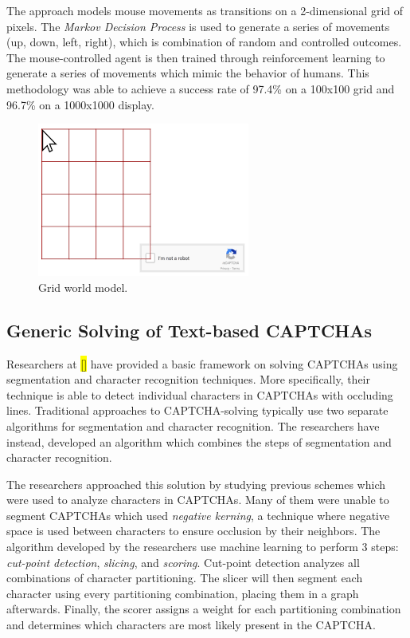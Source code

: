 \documentclass[11pt,conference]{IEEEtran}
\begin{document}
The approach models mouse movements as transitions on a 2-dimensional grid
of pixels. The \emph{Markov Decision Process} is used to generate a series of
movements (up, down, left, right), which is combination of random and controlled
outcomes. The mouse-controlled agent is then trained through reinforcement
learning to generate a series of movements which mimic the behavior of humans.
This methodology was able to achieve a success rate of 97.4\% on a 100x100
grid and 96.7\% on a 1000x1000 display.

\begin{figure}[htbp]
	\centerline{\includegraphics[scale=0.5]{images/grid-world.png}}
	\caption{Grid world model.}
	\label{figure}
\end{figure}

\subsection{Generic Solving of Text-based CAPTCHAs}
Researchers at \hl{[]} have provided a basic framework on solving CAPTCHAs using
segmentation and character recognition techniques. More specifically, their
technique is able to detect individual characters in CAPTCHAs with occluding
lines. Traditional approaches to CAPTCHA-solving typically use two separate
algorithms for segmentation and character recognition. The researchers have
instead, developed an algorithm which combines the steps of segmentation and character
recognition.

The researchers approached this solution by studying previous schemes which
were used to analyze characters in CAPTCHAs. Many of them were unable to
segment CAPTCHAs which used \emph{negative kerning}, a technique
where negative space is used between characters to ensure occlusion 
by their neighbors. The algorithm developed by the researchers use machine
learning to perform 3 steps: \emph{cut-point detection}, \emph{slicing}, and
\emph{scoring}.
Cut-point detection analyzes all combinations of character partitioning. The
slicer will then segment each character using every partitioning combination,
placing them in a graph afterwards. Finally, the scorer assigns a weight for
each partitioning combination and determines which characters are most likely
present in the CAPTCHA.
\end{document}
